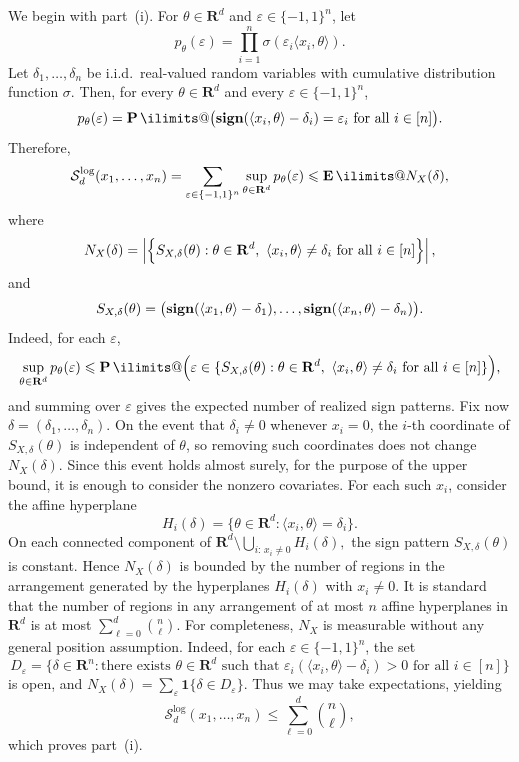 \documentclass[11pt, letterpaper, hidelinks]{article}
\makeatletter
\renewcommand{\proofname}{\textit{\textbf{Proof}}}
\renewenvironment{proof}[1][\proofname]{\par\pushQED{\qed}\normalfont \topsep6\p@\@plus6\p@\relax\trivlist\item[\hskip\labelsep#1\@addpunct{}]\ignorespaces}{\popQED\endtrivlist\@endpefalse}
\newcommand{\R}{\mathbf R}
\DeclareMathOperator{\sign}{\bf sign}
\newcommand{\1}{\mathbf 1}
\newcommand{\eps}{\varepsilon}
\renewcommand{\le}{\leqslant}
\newcommand{\iid}{\textnormal{i.i.d.}}
\newcommand{\E}{\operatorname*{\mathbf{E}}\ilimits@}
\renewcommand{\P}{\operatorname*{\mathbf{P}}\ilimits@}
\theoremstyle{plain}
\theoremstyle{definition}
\newcommand{\defn}{=}
\makeatother
\begin{document}
\begin{proof}
We begin with part~(i). For $\theta \in \R^d$ and $\eps \in \{-1,1\}^n$, let
\[
p_\theta(\eps)
\defn
\prod_{i=1}^n \sigma(\eps_i \langle x_i,\theta\rangle).
\]
Let $\delta_1,\dots,\delta_n$ be \iid\ real-valued random variables with cumulative distribution function $\sigma$. Then, for every $\theta \in \R^d$ and every $\eps \in \{-1,1\}^n$,
\[
p_\theta(\eps)
=
\P\bigl(\sign(\langle x_i,\theta\rangle-\delta_i)=\eps_i \ \mbox{for all } i\in[n]\bigr).
\]
Therefore,
\[
\mathcal{S}_d^{\operatorname{log}}(x_1,\dots,x_n)
=
\sum_{\eps \in \{-1,1\}^n}\sup_{\theta\in\R^d} p_\theta(\eps)
\le
\E N_X(\delta),
\]
where
\[
N_X(\delta)
\defn
\left|
\Bigl\{
S_{X,\delta}(\theta): \theta\in\R^d,\ \langle x_i,\theta\rangle\neq \delta_i \ \mbox{for all } i\in[n]
\Bigr\}
\right|,
\]
and
\[
S_{X,\delta}(\theta)
\defn
\bigl(
\sign(\langle x_1,\theta\rangle-\delta_1),\dots,\sign(\langle x_n,\theta\rangle-\delta_n)
\bigr).
\]
Indeed, for each $\eps$,
\[
\sup_{\theta\in\R^d} p_\theta(\eps)
\le
\P\Bigl(\eps \in \{S_{X,\delta}(\theta):\theta\in\R^d,\ \langle x_i,\theta\rangle\neq \delta_i \ \mbox{for all } i\in[n]\}\Bigr),
\]
and summing over $\eps$ gives the expected number of realized sign patterns. Fix now $\delta=(\delta_1,\dots,\delta_n)$. On the event that $\delta_i\neq 0$ whenever $x_i=0$, the $i$-th coordinate of $S_{X,\delta}(\theta)$ is independent of $\theta$, so removing such coordinates does not change $N_X(\delta)$. Since this event holds almost surely, for the purpose of the upper bound, it is enough to consider the nonzero covariates. For each such $x_i$, consider the affine hyperplane
\[
H_i(\delta)\defn \{\theta\in\R^d:\langle x_i,\theta\rangle=\delta_i\}.
\]
On each connected component of
$\R^d \setminus \bigcup_{i:\,x_i\neq 0} H_i(\delta),
$
the sign pattern $S_{X,\delta}(\theta)$ is constant. Hence $N_X(\delta)$ is bounded by the number of regions in the arrangement generated by the hyperplanes $H_i(\delta)$ with $x_i\neq 0$. It is standard that the number of regions in any arrangement of at most $n$ affine hyperplanes in $\R^d$ is at most
$
\sum_{\ell=0}^{d}\binom{n}{\ell}.
$
For completeness, $N_X$ is measurable without any general position assumption. Indeed, for each $\eps\in\{-1,1\}^n$, the set
\[
D_\eps=\{\delta\in\R^n:\text{there exists }\theta\in\R^d
\text{ such that }\eps_i(\langle x_i,\theta\rangle-\delta_i)>0
\text{ for all }i\in[n]\}
\]
is open, and $N_X(\delta)=\sum_\eps\1\{\delta\in D_\eps\}$. Thus we may take expectations, yielding
\[
\mathcal{S}_d^{\operatorname{log}}(x_1,\dots,x_n)
\le
\sum_{\ell=0}^{d}\binom{n}{\ell},
\]
which proves part~(i).


\end{proof}
\end{document}
